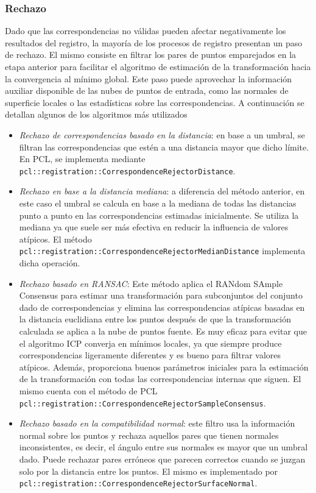 \subsubsection{Rechazo}
Dado que las correspondencias no válidas pueden afectar negativamente los resultados del registro, la mayoría de los procesos de registro presentan un paso de rechazo. El mismo consiste en filtrar los pares de puntos emparejados en la etapa anterior para facilitar el algoritmo de estimación de la transformación hacia la convergencia al mínimo global. Este paso puede aprovechar la información auxiliar disponible de las nubes de puntos de entrada, como las normales de superficie locales o las estadísticas sobre las correspondencias. A continuación se detallan algunos de los algoritmos más utilizados
\begin{itemize}
    \item \textit{Rechazo de correspondencias basado en la distancia}: en base a un umbral, se filtran las correspondencias que estén a una distancia mayor que dicho límite. En PCL, se implementa mediante \lstinline{pcl::registration::CorrespondenceRejectorDistance}.
    \item \textit{Rechazo en base a la distancia mediana}: a diferencia del método anterior, en este caso el umbral se calcula en base a la mediana de todas las distancias punto a punto en las correspondencias estimadas inicialmente. Se utiliza la mediana ya que suele ser más efectiva en reducir la influencia de valores atípicos. El método \lstinline{pcl::registration::CorrespondenceRejectorMedianDistance} implementa dicha operación.
    \item \textit{Rechazo basado en RANSAC}: Este método aplica el RANdom SAmple Consensus \cite{fischler1981} para estimar una transformación para subconjuntos del conjunto dado de correspondencias y elimina las correspondencias atípicas basadas en la distancia euclidiana entre los puntos después de que la transformación calculada se aplica a la nube de puntos fuente. Es muy eficaz para evitar que el algoritmo ICP converja en mínimos locales, ya que siempre produce correspondencias ligeramente diferentes y es bueno para filtrar valores atípicos. Además, proporciona buenos parámetros iniciales para la estimación de la transformación con todas las correspondencias internas que siguen. El mismo cuenta con el método de PCL \lstinline{pcl::registration::CorrespondenceRejectorSampleConsensus}.
    \item \textit{Rechazo basado en la compatibilidad normal}: este filtro usa la información normal sobre los puntos y rechaza aquellos pares que tienen normales inconsistentes, es decir, el ángulo entre sus normales es mayor que un umbral dado. Puede rechazar pares erróneos que parecen correctos cuando se juzgan solo por la distancia entre los puntos. El mismo es implementado por \lstinline{pcl::registration::CorrespondenceRejectorSurfaceNormal}.
\end{itemize}

